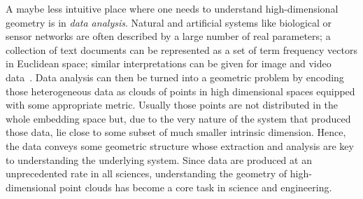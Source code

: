 A maybe less intuitive place where one needs to understand  high-dimensional geometry is in {\em data analysis}. Natural and artificial systems like biological or sensor networks are often described by a large number of real parameters; a collection of text documents can be represented as a set of term frequency vectors in Euclidean space; similar interpretations can be given for image and video data~\cite{sl-mwp-2000}.  Data analysis can then be turned into a geometric problem by encoding those heterogeneous data as clouds of points in high dimensional spaces equipped with some appropriate metric. Usually those points are not distributed in the whole embedding space but, due to the very nature of the system that produced those data, lie close to some subset of much smaller intrinsic dimension. Hence, the data conveys some geometric structure whose extraction and analysis are key to understanding the underlying system.
Since data are produced at an unprecedented rate in all sciences, 
understanding the geometry of high-dimensional point clouds has become a core task in science and engineering. 








